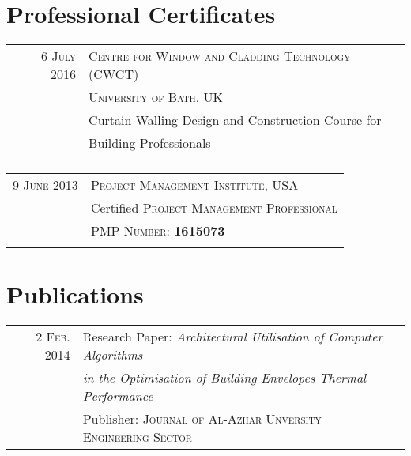\documentclass[a4paper,11pt]{article} %
\begin{document}

\section{Professional Certificates}

\begin{tabular}{r|l}
\hspace{9.5mm}\textsc{6 July} 2016 & \textsc{Centre for Window and Cladding Technology (CWCT)}\\
& \textsc{University of Bath, UK}\\
& Curtain Walling Design and Construction Course for \\
& Building Professionals \\
\multicolumn{2}{c}{} \\
\end{tabular}

\begin{tabular}{r|l}
\hspace{9.5mm}\textsc{9 June} 2013 & \textsc{Project Management Institute}, USA\\
& Certified \textsc{Project Management Professional}\\
& \textsc{PMP Number:} \textbf{1615073}\\
\multicolumn{2}{c}{} \\
\end{tabular}



\section{Publications}

\begin{tabular}{r|l}
\hspace{9.5mm}\textsc{ 2 Feb.} 2014 & Research Paper: \emph{Architectural Utilisation of Computer Algorithms}\\
&\emph{ in the Optimisation of Building Envelopes Thermal Performance}\\
& Publisher: \textsc{Journal of Al-Azhar Unversity -- Engineering Sector}\\

\end{tabular}
\end{document}
